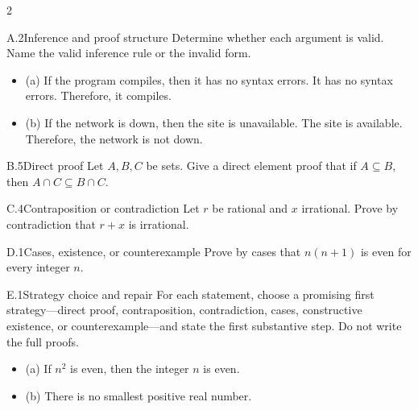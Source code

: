 \documentclass[9pt]{extarticle}
\begin{document}
\begin{multicols}{2}
\begin{CoreProblem}{A.2}{Inference and proof structure}
Determine whether each argument is valid. Name the valid inference rule or the invalid form.
\begin{itemize}
  \item (a) If the program compiles, then it has no syntax errors. It has no syntax errors. Therefore, it compiles.
  \item (b) If the network is down, then the site is unavailable. The site is
        available. Therefore, the network is not down.
\end{itemize}
\end{CoreProblem}
\begin{CoreProblem}{B.5}{Direct proof}
Let $A,B,C$ be sets. Give a direct element proof that if $A\subseteq B$, then
$A\cap C\subseteq B\cap C$.
\end{CoreProblem}
\begin{CoreProblem}{C.4}{Contraposition or contradiction}
Let $r$ be rational and $x$ irrational. Prove by contradiction that $r+x$ is irrational.
\end{CoreProblem}
\columnbreak
\begin{CoreProblem}{D.1}{Cases, existence, or counterexample}
Prove by cases that $n(n+1)$ is even for every integer $n$.
\end{CoreProblem}
\begin{CoreProblem}{E.1}{Strategy choice and repair}
For each statement, choose a promising first strategy---direct proof,
contraposition, contradiction, cases, constructive existence, or
counterexample---and state the first substantive step. Do not write the full
proofs.
\begin{itemize}
  \item (a) If $n^2$ is even, then the integer $n$ is even.
  \item (b) There is no smallest positive real number.
\end{itemize}
\end{CoreProblem}
\end{multicols}
\CoreWorkArea
\FormBreak
{}
\end{document}
